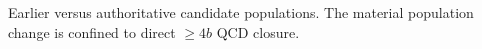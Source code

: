 Earlier versus authoritative candidate populations. The material population change is confined to direct $\geq4b$ QCD closure.
